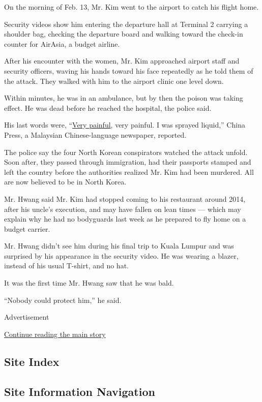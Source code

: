 On the morning of Feb. 13, Mr. Kim went to the airport to catch his
flight home.

Security videos show him entering the departure hall at Terminal 2
carrying a shoulder bag, checking the departure board and walking toward
the check-in counter for AirAsia, a budget airline.

After his encounter with the women, Mr. Kim approached airport staff and
security officers, waving his hands toward his face repeatedly as he
told them of the attack. They walked with him to the airport clinic one
level down.

Within minutes, he was in an ambulance, but by then the poison was
taking effect. He was dead before he reached the hospital, the police
said.

His last words were,
``\href{http://www.thestar.com.my/news/nation/2017/02/17/jong-nam-last-words-very-painful/\#y1L2cD6yr5HpXtMZ.99}{Very
painful}, very painful. I was sprayed liquid,'' China Press, a Malaysian
Chinese-language newspaper, reported.

The police say the four North Korean conspirators watched the attack
unfold. Soon after, they passed through immigration, had their passports
stamped and left the country before the authorities realized Mr. Kim had
been murdered. All are now believed to be in North Korea.

Mr. Hwang said Mr. Kim had stopped coming to his restaurant around 2014,
after his uncle's execution, and may have fallen on lean times --- which
may explain why he had no bodyguards last week as he prepared to fly
home on a budget carrier.

Mr. Hwang didn't see him during his final trip to Kuala Lumpur and was
surprised by his appearance in the security video. He was wearing a
blazer, instead of his usual T-shirt, and no hat.

It was the first time Mr. Hwang saw that he was bald.

``Nobody could protect him,'' he said.

Advertisement

\protect\hyperlink{after-bottom}{Continue reading the main story}

\hypertarget{site-index}{%
\subsection{Site Index}\label{site-index}}

\hypertarget{site-information-navigation}{%
\subsection{Site Information
Navigation}\label{site-information-navigation}}

